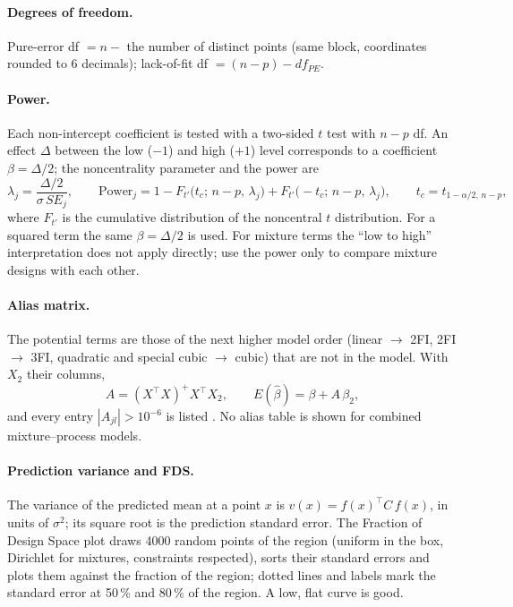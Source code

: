 \paragraph{Degrees of freedom.} Pure-error df $= n - $ the number of distinct points (same block, coordinates rounded
to 6 decimals); lack-of-fit df $= (n - p) - df_{PE}$.

\paragraph{Power.} Each non-intercept coefficient is tested with a two-sided $t$ test with $n - p$ df. An effect
$\Delta$ between the low ($-1$) and high ($+1$) level corresponds to a coefficient $\beta = \Delta/2$; the
noncentrality parameter and the power are \citep{montgomery2017}
\begin{equation}
\lambda_j = \frac{\Delta/2}{\sigma\, SE_j}, \qquad
\text{Power}_j = 1 - F_{t'}\bigl(t_c;\, n-p,\, \lambda_j\bigr) + F_{t'}\bigl(-t_c;\, n-p,\, \lambda_j\bigr),
\qquad t_c = t_{1-\alpha/2,\, n-p},
\label{eq:ch04-power}
\end{equation}
where $F_{t'}$ is the cumulative distribution of the noncentral $t$ distribution. For a squared term the same
$\beta = \Delta/2$ is used. For mixture terms the ``low to high'' interpretation does not apply directly; use the
power only to compare mixture designs with each other.

\paragraph{Alias matrix.} The potential terms are those of the next higher model order (linear $\rightarrow$ 2FI,
2FI $\rightarrow$ 3FI, quadratic and special cubic $\rightarrow$ cubic) that are not in the model. With $X_2$ their
columns,
\begin{equation}
A = (X^\top X)^{+} X^\top X_2, \qquad E(\hat\beta) = \beta + A\,\beta_2 ,
\label{eq:ch04-alias}
\end{equation}
and every entry $|A_{jl}| > 10^{-6}$ is listed \citep{myers2016}. No alias table is shown for combined
mixture--process models.

\paragraph{Prediction variance and FDS.} The variance of the predicted mean at a point $x$ is
$v(x) = f(x)^\top C\, f(x)$, in units of $\sigma^2$; its square root is the prediction standard error. The Fraction of
Design Space plot \citep{myers2016} draws 4000 random points of the region (uniform in the box, Dirichlet for
mixtures, constraints respected), sorts their standard errors and plots them against the fraction of the region;
dotted lines and labels mark the standard error at 50\,\% and 80\,\% of the region. A low, flat curve is good.

